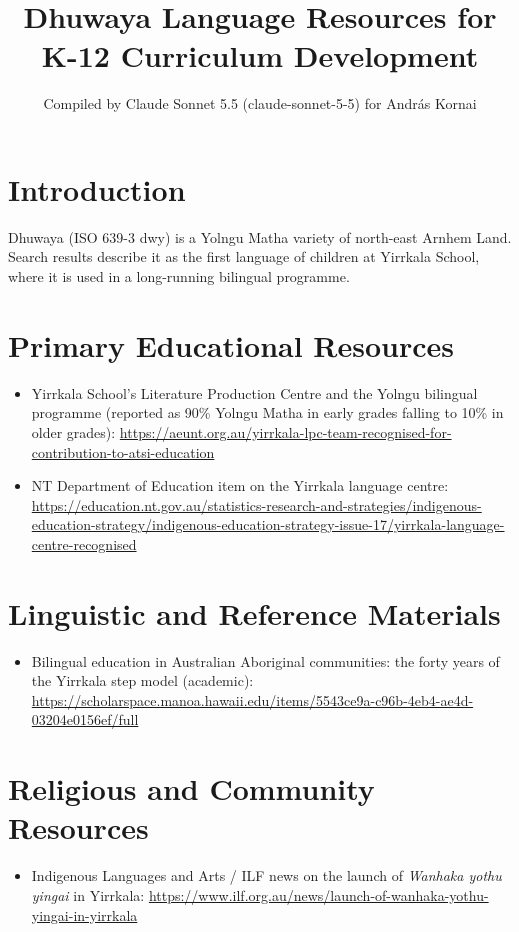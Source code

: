 \documentclass[12pt]{article}
\title{Dhuwaya Language Resources for K-12 Curriculum Development}
\author{Compiled by Claude Sonnet 5.5 (claude-sonnet-5-5) for Andr\'as Kornai}
\date{}
\begin{document}
\maketitle

\section{Introduction}
Dhuwaya (ISO 639-3 dwy) is a Yolngu Matha variety of north-east Arnhem Land. Search results describe it as the first language of children at Yirrkala School, where it is used in a long-running bilingual programme.

\section{Primary Educational Resources}
\begin{itemize}
\item Yirrkala School's Literature Production Centre and the Yolngu bilingual programme (reported as 90\% Yolngu Matha in early grades falling to 10\% in older grades): \url{https://aeunt.org.au/yirrkala-lpc-team-recognised-for-contribution-to-atsi-education}
\item NT Department of Education item on the Yirrkala language centre: \url{https://education.nt.gov.au/statistics-research-and-strategies/indigenous-education-strategy/indigenous-education-strategy-issue-17/yirrkala-language-centre-recognised}
\end{itemize}

\section{Linguistic and Reference Materials}
\begin{itemize}
\item Bilingual education in Australian Aboriginal communities: the forty years of the Yirrkala step model (academic): \url{https://scholarspace.manoa.hawaii.edu/items/5543ce9a-c96b-4eb4-ae4d-03204e0156ef/full}
\end{itemize}

\section{Religious and Community Resources}
\begin{itemize}
\item Indigenous Languages and Arts / ILF news on the launch of \emph{Wanhaka yothu yingai} in Yirrkala: \url{https://www.ilf.org.au/news/launch-of-wanhaka-yothu-yingai-in-yirrkala}
\end{itemize}
\end{document}
